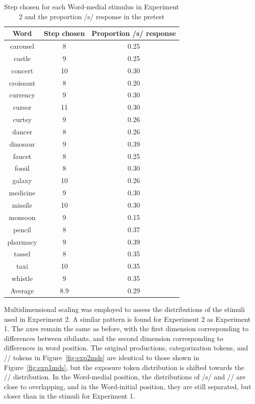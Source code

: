\begin{table}[ht]
\caption{Step chosen for each Word-medial stimulus in Experiment 2 and the proportion /s/ response in the pretest}
\label{tbl:exp2srespfinal}
\centering
\begin{tabular}{ccc}
\toprule
 Word & Step chosen & Proportion /s/ response \\
\midrule
 carousel & 8 & 0.25 \\
 castle & 9 & 0.25 \\
 concert & 10 & 0.30 \\
 croissant & 8 & 0.20 \\
 currency & 9 & 0.30 \\
 cursor & 11 & 0.30 \\
 curtsy & 9 & 0.26 \\
 dancer & 8 & 0.26 \\
 dinosaur & 9 & 0.39 \\
 faucet & 8 & 0.25 \\
 fossil & 8 & 0.30 \\
 galaxy & 10 & 0.26 \\
 medicine & 9 & 0.30 \\
missile & 10 & 0.30 \\
monsoon & 9 & 0.15 \\
 pencil & 8 & 0.37 \\
 pharmacy & 9 & 0.39 \\
 tassel & 8 & 0.35 \\
 taxi & 10 & 0.35 \\
 whistle & 9 & 0.35 \\
\midrule
 Average  & 8.9 & 0.29 \\

\bottomrule
\end{tabular}
\end{table}

Multidimensional scaling was employed to assess the distributions of the stimuli used in Experiment 2.
A similar pattern is found for Experiment 2 as Experiment 1.
The axes remain the same as before, with the first dimension corresponding to differences between sibilants, and the second dimension corresponding to differences in word position.
The original productions, categorization tokens, and /\textesh/ tokens in Figure~\ref{fig:exp2mds} are identical to those shown in Figure~\ref{fig:exp1mds}, but the exposure token distribution is shifted towards the /\textesh/ distribution.  
In the Word-medial position, the distributions of /s/ and /\textesh/ are close to overlapping, and in the Word-initial position, they are still separated, but closer than in the stimuli for Experiment 1.


